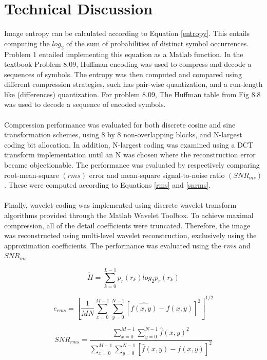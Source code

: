\documentclass[./rarnold_project6.tex]{subfiles}
\begin{document}
\clearpage

\section*{Technical Discussion}

\noindent Image entropy can be calculated according to Equation \eqref{entropy}.  This entails computing the $log_2$ of the sum of probabilities of distinct symbol occurrences.  Problem 1 entailed implementing this equation as a Matlab function.  In the textbook Problem 8.09, Huffman encoding was used to compress and decode a sequences of symbols.  The entropy was then computed and compared using different compression strategies, such has pair-wise quantization, and a run-length like (differences) quantization. For problem 8.09, The Huffman table from Fig 8.8 was used to decode a sequence of encoded symbols.
\\ \\
\noindent Compression performance was evaluated for both discrete cosine and sine transformation schemes, using 8 by 8 non-overlapping blocks, and N-largest coding bit allocation.  In addition, N-largest coding was examined using a DCT transform implementation until an N was chosen where the reconstruction error became objectionable.  The performance was evaluated by respectively comparing root-mean-square $(rms)$ error and mean-square signal-to-noise ratio $(SNR_{ms})$.  These were computed according to Equations \eqref{rms} and \eqref{snrms}.  
\\ \\
\noindent Finally, wavelet coding was implemented using discrete wavelet transform algorithms provided through the Matlab Wavelet Toolbox.  To achieve maximal compression, all of the detail coefficients were truncated.  Therefore, the image was reconstructed using multi-level wavelet reconstruction, exclusively using the approximation coefficients.  The performance was evaluated using the $rms$ and $SNR_{ms}$


\begin{equation}
\label{entropy}
\tilde{H} = \sum_{k=0}^{L-1} p_{r}(r_{k})log_2p_r(r_k) 
\end{equation}

\begin{equation}
\label{rms}
e_{rms} = \left[ \frac{1}{MN} \sum_{x=0}^{M-1} \sum_{y=0}^{N-1} [\hat{f(x,y)} - f(x,y)]^{2}\right ]^{1/2}
\end{equation}

\begin{equation}
\label{snrms}
SNR_{rms} = \frac{\sum_{x=0}^{M-1}\sum_{y=0}^{N-1} \hat{f}(x,y)^2}{\sum_{x=0}^{M-1}\sum_{y=0}^{N-1} [\hat{f}(x,y) - f(x,y)]^2}
\end{equation}
\end{document}
